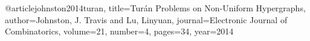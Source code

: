 @article{johnston2014turan,
  title={Tur{\'a}n Problems on Non-Uniform Hypergraphs},
  author={Johnston, J. Travis and Lu, Linyuan},
  journal={Electronic Journal of Combinatorics},
  volume={21},
  number={4},
  pages={34},
  year={2014}
}

